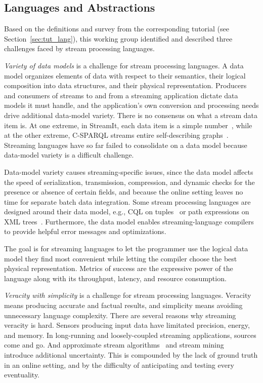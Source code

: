 \subsection{Languages and Abstractions}\label{sec:wg_lang}

Based on the definitions and survey from the corresponding tutorial
(see Section~\ref{sec:tut_lang}), this working group identified and
described three challenges faced by stream processing languages.

\emph{Variety of data models} is a challenge for stream processing
languages. A data model organizes elements of data with respect to
their semantics, their logical composition into data structures, and
their physical representation. Producers and consumers of streams to
and from a streaming application dictate data models it must handle,
and the application's own conversion and processing needs drive
additional data-model variety.  There is no consensus on what a stream
data item is. At one extreme, in StreamIt, each data item is a simple
number~\cite{thies_et_al_2002}, while at the other extreme, C-SPARQL
streams entire self-describing graphs~\cite{barbieri_et_al_2009}.
Streaming languages have so far failed to consolidate on a data model
because data-model variety is a difficult challenge.

Data-model variety causes streaming-specific issues, since the data
model affects the speed of serialization, transmission, compression,
and dynamic checks for the presence or absence of certain fields, and
because the online setting leaves no time for separate batch data
integration. Some stream processing languages are designed around
their data model, e.g., CQL on tuples~\cite{arasu_babu_widom_2006} or
path expressions on XML trees~\cite{diao_et_al_2002}. Furthermore, the
data model enables streaming-language compilers to provide helpful
error messages and optimizations.

The goal is for streaming languages to let the programmer use the
logical data model they find most convenient while letting the
compiler choose the best physical representation. Metrics of success
are the expressive power of the language along with its throughput,
latency, and resource consumption.

\emph{Veracity with simplicity} is a challenge for stream processing
languages. Veracity means producing accurate and factual results, and
simplicity means avoiding unnecessary language complexity. There are
several reasons why streaming veracity is hard. Sensors producing
input data have limitated precision, energy, and memory. In
long-running and loosely-coupled streaming applications,
sources come and go. And approximate stream
algorithms~\cite{babcock_et_al_2002} and stream
mining~\cite{gaber_zaslavsky_krishnaswamy_2005} introduce additional
uncertainty. This is compounded by the lack of ground truth in an
online setting, and by the difficulty of anticipating and testing
every eventuality.

